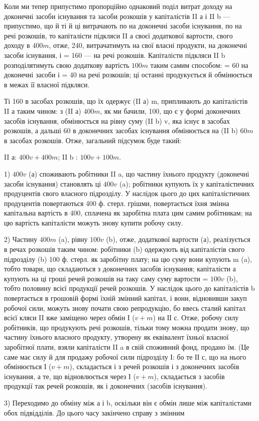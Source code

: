 Коли ми тепер припустимо пропорційно однаковий поділ витрат
доходу на доконечні засоби існування та засоби розкошів у капіталістів
II а і II b — припустимо, що й ті й ці витрачають по  на доконечні
засоби існування, по  на речі розкошів, то капіталісти підкляси II а
 своєї додаткової вартости, свого доходу в $400 m$, отже, 240, витрачатимуть
на свої власні продукти, на доконечні засоби існування, і
 = 160 — на речі розкошів. Капіталісти підкляси II b розподілятимуть
свою додаткову вартість $100 m$ таким самим способом:  = 60 на доконечні
засоби і  = 40 на речі розкошів; ці останні продукується й
обмінюється в межах її власної підкляси.

Ті 160 в засобах розкошів, що їх одержує (II а) m, припливають до
капіталістів II а таким чином: з (II а) $400 m$, як ми бачили, 100, що є у
формі доконечних засобів існування, обмінюється на рівну суму (II b) v,
яка існує в засобах розкошів, а дальші 60 в доконечних засобах існування
обмінюється на (II b) $60 m$ в засобах розкошів. Отже, загальний
підсумок буде такий:

II а: $400 v + 400 m$; II b : $100 v + 100 m$.

1) $400 v$ (а) споживають робітники II a, що частину їхнього продукту
(доконечні засоби існування) становлять ці $400 v$ (a); робітники купують
їх у капіталістичних продуцентів свого власного підрозділу. У наслідок
цього до цих капіталістичних продуцентів повертаються 400 ф. стерл.
грішми, повертається їхня змінна капітальна вартість в 400, сплачена як
заробітна плата цим самим робітникам; на цю вартість капіталісти можуть
знову купити робочу силу.

2) Частину $400 m$ (a), рівну $100 v$ (b), отже,  додаткової вартости (а),
реалізується в речах розкошів таким чином: робітники (b) одержують від
капіталістів свого підрозділу (b) 100 ф. стерл. як заробітну плату; на
цю суму вони купують m (a), тобто товари, що складаються з доконечних
засобів існування; капіталісти а купують на ці гроші речей
розкошів на таку саму суму вартости = $100 v$ (b), тобто половину всієї
продукції речей розкошів. У наслідок цього до капіталістів b повертається
в грошовій формі їхній змінний капітал, і вони, відновивши закуп
робочої сили, можуть знову почати свою репродукцію, бо ввесь сталий
капітал всієї кляси II вже заміщено через обмін І ($v + m$) на ІІ с. Отже,
робочу силу робітників, що продукують речі розкошів, тільки тому
можна продати знову, що частину їхнього власного продукту, утворену
як еквівалент їхньої власної заробітної плати, взяли капіталісти II a в
свій споживний фонд, продано їм. (Це саме має силу й для продажу робочої
сили підрозділу І: бо те ІІ с, що на нього обмінюється І ($v + m$), складається
і з речей розкошів і з доконечних засобів існування, а те, що
відновлюється через І ($v + m$), складається з засобів продукції так речей
розкошів, як і доконечних (засобів існування).

3) Переходимо до обміну між а і b, оскільки він є обмін лише між
капіталістами обох підвідділів. До цього часу закінчено справу з змінним
\parbreak{}  %
